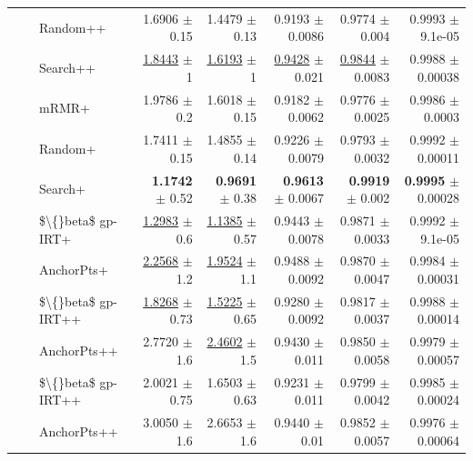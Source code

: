 \begin{longtable}{llp{}rrrrr}
 &  & Random++ & 1.6906 {\scriptsize $\pm$ 0.15} & 1.4479 {\scriptsize $\pm$ 0.13} & 0.9193 {\scriptsize $\pm$ 0.0086} & 0.9774 {\scriptsize $\pm$ 0.004} & 0.9993 {\scriptsize $\pm$ 9.1e-05} \\
 &  & Search++ & \underline{1.8443} {\scriptsize $\pm$ 1} & \underline{1.6193} {\scriptsize $\pm$ 1} & \underline{0.9428} {\scriptsize $\pm$ 0.021} & \underline{0.9844} {\scriptsize $\pm$ 0.0083} & 0.9988 {\scriptsize $\pm$ 0.00038} \\
 &  & mRMR+ & 1.9786 {\scriptsize $\pm$ 0.2} & 1.6018 {\scriptsize $\pm$ 0.15} & 0.9182 {\scriptsize $\pm$ 0.0062} & 0.9776 {\scriptsize $\pm$ 0.0025} & 0.9986 {\scriptsize $\pm$ 0.0003} \\
 &  & Random+ & 1.7411 {\scriptsize $\pm$ 0.15} & 1.4855 {\scriptsize $\pm$ 0.14} & 0.9226 {\scriptsize $\pm$ 0.0079} & 0.9793 {\scriptsize $\pm$ 0.0032} & 0.9992 {\scriptsize $\pm$ 0.00011} \\
 &  & Search+ & \textbf{1.1742} {\scriptsize $\pm$ 0.52} & \textbf{0.9691} {\scriptsize $\pm$ 0.38} & \textbf{0.9613} {\scriptsize $\pm$ 0.0067} & \textbf{0.9919} {\scriptsize $\pm$ 0.002} & \textbf{0.9995} {\scriptsize $\pm$ 0.00028} \\
 &  & \$\textbackslash\{\}beta\$ gp-IRT+ & \underline{1.2983} {\scriptsize $\pm$ 0.6} & \underline{1.1385} {\scriptsize $\pm$ 0.57} & 0.9443 {\scriptsize $\pm$ 0.0078} & 0.9871 {\scriptsize $\pm$ 0.0033} & 0.9992 {\scriptsize $\pm$ 9.1e-05} \\
 &  & AnchorPts+ & \underline{2.2568} {\scriptsize $\pm$ 1.2} & \underline{1.9524} {\scriptsize $\pm$ 1.1} & 0.9488 {\scriptsize $\pm$ 0.0092} & 0.9870 {\scriptsize $\pm$ 0.0047} & 0.9984 {\scriptsize $\pm$ 0.00031} \\
 &  & \$\textbackslash\{\}beta\$ gp-IRT++ & \underline{1.8268} {\scriptsize $\pm$ 0.73} & \underline{1.5225} {\scriptsize $\pm$ 0.65} & 0.9280 {\scriptsize $\pm$ 0.0092} & 0.9817 {\scriptsize $\pm$ 0.0037} & 0.9988 {\scriptsize $\pm$ 0.00014} \\
 &  & AnchorPts++ & 2.7720 {\scriptsize $\pm$ 1.6} & \underline{2.4602} {\scriptsize $\pm$ 1.5} & 0.9430 {\scriptsize $\pm$ 0.011} & 0.9850 {\scriptsize $\pm$ 0.0058} & 0.9979 {\scriptsize $\pm$ 0.00057} \\
 &  & \$\textbackslash\{\}beta\$ gp-IRT++ & 2.0021 {\scriptsize $\pm$ 0.75} & 1.6503 {\scriptsize $\pm$ 0.63} & 0.9231 {\scriptsize $\pm$ 0.011} & 0.9799 {\scriptsize $\pm$ 0.0042} & 0.9985 {\scriptsize $\pm$ 0.00024} \\
 &  & AnchorPts++ & 3.0050 {\scriptsize $\pm$ 1.6} & 2.6653 {\scriptsize $\pm$ 1.6} & 0.9440 {\scriptsize $\pm$ 0.01} & 0.9852 {\scriptsize $\pm$ 0.0057} & 0.9976 {\scriptsize $\pm$ 0.00064} \\

\end{longtable}
